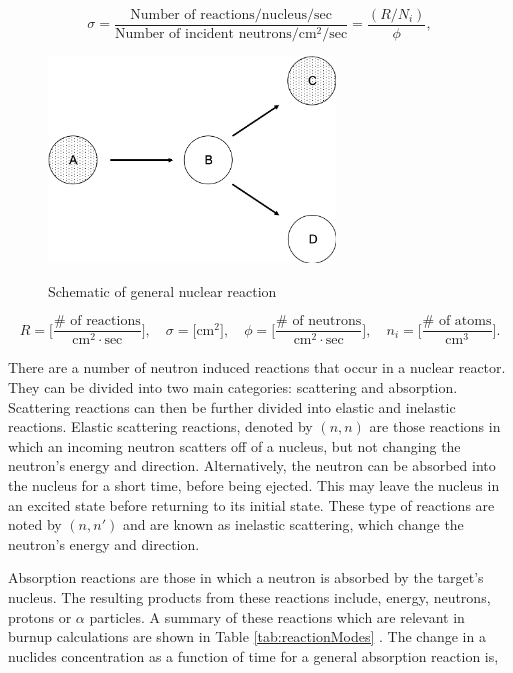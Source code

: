 \begin{equation}
    \sigma = \frac{\text{Number of reactions} / \text{nucleus} / \text{sec}}{\text{Number of incident neutrons} / \text{cm}^{2} / \text{sec}} = \frac{(R/N_{i})}{\phi},
\end{equation}

\clearpage

\begin{figure}[b]
  \centering
  \includegraphics[width=3.0in]{images/chapter-2/nuclearReaction.png}\\
  \caption{Schematic of general nuclear reaction}
  \label{fig:nuclearReaction}
\end{figure} 

\clearpage

\begin{equation*}
    R = \bigg[\frac{\# \text{ of reactions}}{\text{cm}^{2}\cdot \text{sec}}\bigg], \quad \sigma = \big[\text{cm}^{2}\big], \quad \phi = \bigg[\frac{\# \text{ of neutrons}}{\text{cm}^{2}\cdot \text{sec}} \bigg], \quad n_{i} = \bigg[\frac{\# \text{ of atoms}}{\text{cm}^{3}}\bigg].
\end{equation*}

There are a number of neutron induced reactions that occur in a nuclear reactor. They can be divided into two main categories: scattering and absorption. Scattering reactions can then be further divided into elastic and inelastic reactions. Elastic scattering reactions, denoted by $(n,n)$ are those reactions in which an incoming neutron scatters off of a nucleus, but not changing the neutron's energy and direction. Alternatively, the neutron can be absorbed into the nucleus for a short time, before being ejected. This may leave the nucleus in an excited state before returning to its initial state. These type of reactions are noted by $(n,n')$ and are known as inelastic scattering, which change the neutron's energy and direction. 

Absorption reactions are those in which a neutron is absorbed by the target's nucleus. The resulting products from these reactions include, energy, neutrons, protons or $\alpha$ particles. A summary of these reactions which are relevant in burnup calculations are shown in Table \ref{tab:reactionModes} \cite{pusaThesis}. The change in a nuclides concentration as a function of time for a general absorption reaction is,

